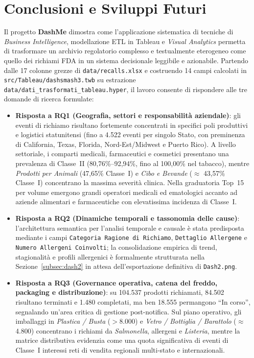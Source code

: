 \chapter{Conclusioni e Sviluppi Futuri}
\label{sec:conclusions}

Il progetto \textbf{DashMe} dimostra come l'applicazione sistematica di tecniche di \textit{Business Intelligence}, modellazione ETL in Tableau e \textit{Visual Analytics} permetta di trasformare un archivio regolatorio complesso e testualmente eterogeneo come quello dei richiami FDA in un sistema decisionale leggibile e azionabile. Partendo dalle 17 colonne grezze di \texttt{data/recalls.xlsx} e costruendo 14 campi calcolati in \texttt{src/Tableau/dashsmash3.twb} su estrazione \texttt{data/dati\_trasformati\_tableau.hyper}, il lavoro consente di rispondere alle tre domande di ricerca formulate:

\begin{itemize}
    \item \textbf{Risposta a RQ1 (Geografia, settori e responsabilità aziendale)}: gli eventi di richiamo risultano fortemente concentrati in specifici poli produttivi e logistici statunitensi (fino a 4.522 eventi per singolo Stato, con preminenza di California, Texas, Florida, Nord-Est/Midwest e Puerto Rico). A livello settoriale, i comparti medicali, farmaceutici e cosmetici presentano una prevalenza di Classe~II (80,76\%--92,94\%, fino al 100,00\% nel tabacco), mentre \textit{Prodotti per Animali} (47,65\% Classe~I) e \textit{Cibo e Bevande} ($\approx$ 43,57\% Classe~I) concentrano la massima severità clinica. Nella graduatoria Top~15 per volume emergono grandi operatori medicali ed ematologici accanto ad aziende alimentari e farmaceutiche con elevatissima incidenza di Classe~I.
    \item \textbf{Risposta a RQ2 (Dinamiche temporali e tassonomia delle cause)}: l'architettura semantica per l'analisi temporale e causale è stata predisposta mediante i campi \texttt{Categoria Ragione di Richiamo}, \texttt{Dettaglio Allergene} e \texttt{Numero Allergeni Coinvolti}; la consolidazione empirica di trend, stagionalità e profili allergenici è formalmente strutturata nella Sezione~\ref{subsec:dash2} in attesa dell'esportazione definitiva di \texttt{Dash2.png}. 
    \item \textbf{Risposta a RQ3 (Governance operativa, catena del freddo, packaging e distribuzione)}: su 104.537 prodotti richiamati, 84.502 risultano terminati e 1.480 completati, ma ben 18.555 permangono ``In corso'', segnalando un'area critica di gestione post-notifica. Sul piano operativo, gli imballaggi in \textit{Plastica / Busta} ($>$8.000) e \textit{Vetro / Bottiglia / Barattolo} ($\approx$ 4.800) concentrano i richiami da \textit{Salmonella}, allergeni e \textit{Listeria}, mentre la matrice distributiva evidenzia come una quota significativa di eventi di Classe~I interessi reti di vendita regionali multi-stato e internazionali.
\end{itemize}

